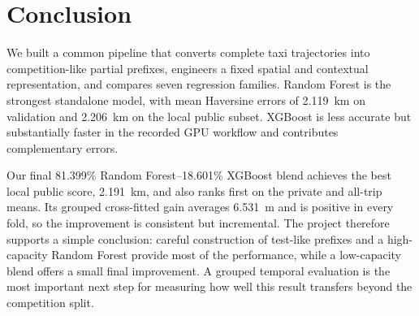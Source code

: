 \section{Conclusion}

We built a common pipeline that converts complete taxi trajectories into competition-like partial prefixes, engineers a fixed spatial and contextual representation, and compares seven regression families.  Random Forest is the strongest standalone model, with mean Haversine errors of 2.119~km on validation and 2.206~km on the local public subset.  XGBoost is less accurate but substantially faster in the recorded GPU workflow and contributes complementary errors.

Our final 81.399\% Random Forest--18.601\% XGBoost blend achieves the best local public score, 2.191~km, and also ranks first on the private and all-trip means.  Its grouped cross-fitted gain averages 6.531~m and is positive in every fold, so the improvement is consistent but incremental.  The project therefore supports a simple conclusion: careful construction of test-like prefixes and a high-capacity Random Forest provide most of the performance, while a low-capacity blend offers a small final improvement.  A grouped temporal evaluation is the most important next step for measuring how well this result transfers beyond the competition split.
